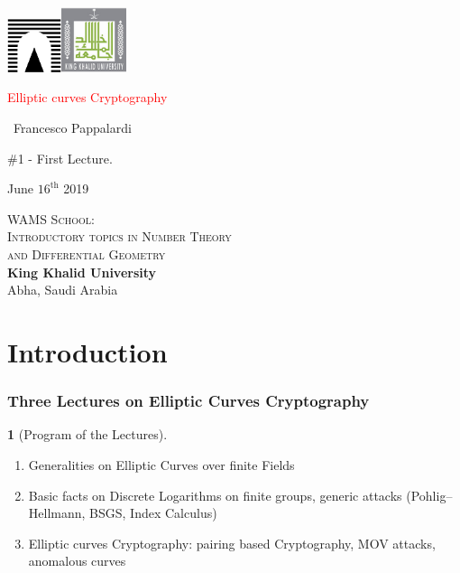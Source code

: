 \documentclass[handout]{beamer}%
\title[Elliptic curves over $\F_{q}$]{\insertlecture}
\theoremstyle{definition}
\newtheorem{Note}[theorem]{\translate{Note}}
\begin{document}
\begin{frame}
\includegraphics[width=1.6cm]{images/roma3.pdf}\hfill\includegraphics[width=1.9cm]{images/kku.jpeg}
\vfill

\begin{center}\begin{sc}
\begin{Large}

\textcolor{red}{Elliptic curves Cryptography}
\end{Large}\bigskip

\ {Francesco Pappalardi}\bigskip\bigskip

\begin{large}\begin{bf}\#1 - First Lecture.
\end{bf}\end{large}\medskip

June $16^{\text{th}}$ 2019\medskip
\vfill
\end{sc}\end{center}

\begin{minipage}[b]{9.3cm}
\textsc{WAMS School:\\
Introductory topics in Number Theory\\ and Differential Geometry}\\
\textbf{King Khalid University}\\
Abha, Saudi Arabia
\end{minipage}\hfill
\end{frame}

\section{Introduction}

\begin{frame}
 \frametitle{Three Lectures on Elliptic Curves Cryptography}

 \begin{Note}[Program of the Lectures]
  \begin{enumerate}[<+-| alert@+>]
   \item Generalities on Elliptic Curves over finite Fields
   \item Basic facts on Discrete Logarithms on finite groups, generic attacks (Pohlig--Hellmann, BSGS, Index Calculus)
   \item Elliptic curves Cryptography: pairing based Cryptography, MOV attacks, anomalous curves
  \end{enumerate}
 \end{Note} 
\end{frame}
\end{document}
